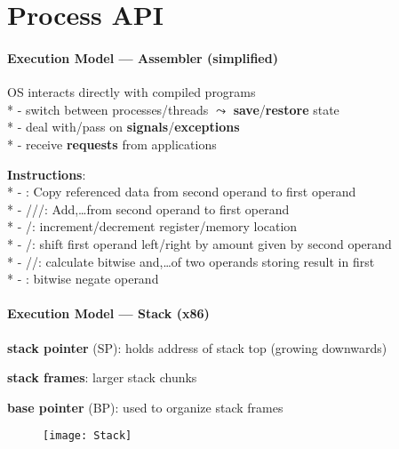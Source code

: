 \section{Process API}

\paragraph{Execution Model --- Assembler (simplified)}
\begin{items}
  \item OS interacts directly with compiled programs \\*
    - switch between processes/threads \( \leadsto \) \textbf{save}/\textbf{restore} state \\*
    - deal with/pass on \textbf{signals}/\textbf{exceptions} \\*
    - receive \textbf{requests} from applications
  \item \textbf{Instructions}: \\*
    - : Copy referenced data from second operand to first operand \\*
    - ///: Add,\dots from second operand to first operand \\*
    - /: increment/decrement register/memory location \\*
    - /: shift first operand left/right by amount given by second operand \\*
    - //: calculate bitwise and,\dots of two operands storing result in first \\*
    - : bitwise negate operand
\end{items}

\paragraph{Execution Model --- Stack (x86)}
\begin{items}
  \item \textbf{stack pointer} (SP): holds address of stack top (growing downwards)
  \item \textbf{stack frames}: larger stack chunks
  \item \textbf{base pointer} (BP): used to organize stack frames
\end{items}

\begin{figure}[H]\centering\label{Stack}\texttt{[image: Stack]}\end{figure}

